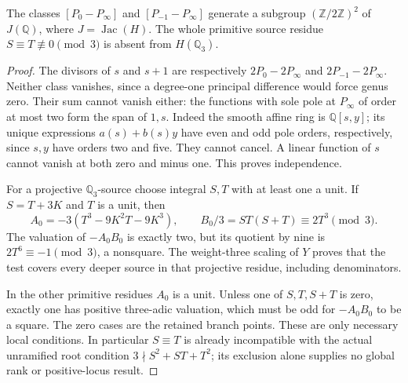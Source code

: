 \begin{lemma}
\label{z2x-torsion-local}
The classes \([P_0-P_\infty]\) and \([P_{-1}-P_\infty]\)
generate a subgroup \((\mathbb Z/2\mathbb Z)^2\) of \(J(\mathbb Q)\),
where \(J=\operatorname{Jac}(H)\). The whole primitive source residue
\(S\equiv T\not\equiv0\pmod3\) is absent from \(H(\mathbb Q_3)\).
\end{lemma}
\begin{proof}
The divisors of \(s\) and \(s+1\) are respectively
\(2P_0-2P_\infty\) and \(2P_{-1}-2P_\infty\). Neither class
vanishes, since a degree-one principal difference would force
genus zero. Their sum cannot vanish either: the functions with
sole pole at \(P_\infty\) of order at most two form the span of
\(1,s\). Indeed the smooth affine ring is \(\mathbb Q[s,y]\);
its unique expressions \(a(s)+b(s)y\) have even and odd pole
orders, respectively, since \(s,y\) have orders two and five.
They cannot cancel. A linear function of \(s\) cannot vanish
at both zero and minus one. This proves independence.

For a projective \(\mathbb Q_3\)-source choose integral \(S,T\)
with at least one a unit. If \(S=T+3K\) and \(T\) is a unit,
then
\[
 A_0=-3(T^3-9K^2T-9K^3),\qquad
 B_0/3=ST(S+T)\equiv2T^3\pmod3.
\]
The valuation of \(-A_0B_0\) is exactly two, but its quotient
by nine is \(2T^6\equiv-1\pmod3\), a nonsquare. The weight-three
scaling of \(Y\) proves that the test covers every deeper source
in that projective residue, including denominators.

In the other primitive residues \(A_0\) is a unit. Unless one
of \(S,T,S+T\) is zero, exactly one has positive three-adic
valuation, which must be odd for \(-A_0B_0\) to be a square.
The zero cases are the retained branch points. These are only
necessary local conditions. In particular \(S\equiv T\) is
already incompatible with the actual unramified root condition
\(3\nmid S^2+ST+T^2\); its exclusion alone supplies no global
rank or positive-locus result.
\end{proof}

